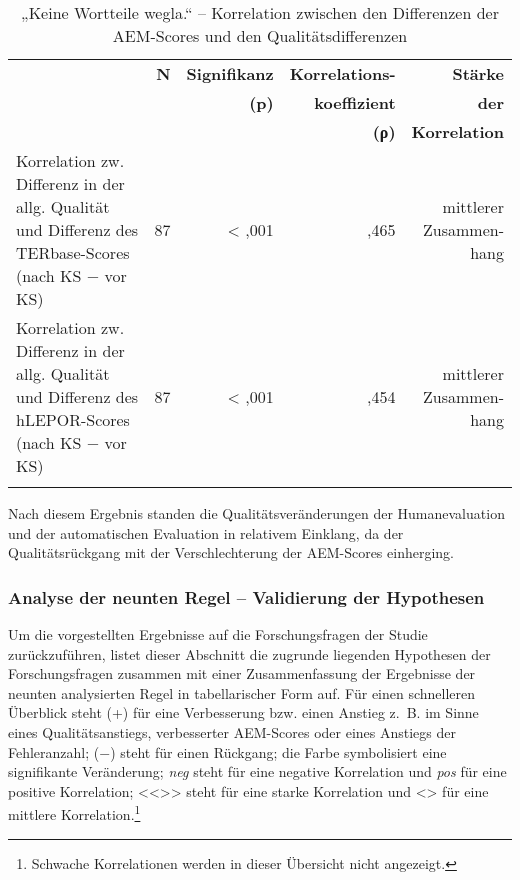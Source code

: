 \begin{table}
\begin{tabularx}{\textwidth}{Xrrrr}

\lsptoprule
& \textbf{N} & { \textbf{Signifikanz} } & \textbf{Korrelations-} & \textbf{Stärke}\\
& & \textbf{(p)} & \textbf{koeffizient} & \textbf{der}\\
& & & \textbf{(ρ)} &  \textbf{Korrelation}\\
\midrule
Korrelation zw. Differenz in der allg. Qualität und Differenz des TERbase{}-Scores (nach KS $-$ vor KS) & { 87} & < ,001 & ,465 & \makecell[tr]{mittlerer\\Zusammen-\\hang}\\
\tablevspace
Korrelation zw. Differenz in der allg. Qualität und Differenz des hLEPOR-Scores (nach KS $-$ vor KS) & { 87} & < ,001 & ,454 & \makecell[tr]{mittlerer\\Zusammen-\\hang}\\
\lspbottomrule
\end{tabularx}
\caption{\label{tab:05:87}„Keine Wortteile wegla.“ -- Korrelation zwischen den Differenzen der AEM-Scores und den Qualitätsdifferenzen   }
\end{table}

Nach diesem Ergebnis standen die Qualitätsveränderungen der Humanevaluation und der automatischen Evaluation in relativem Einklang, da der Qualitätsrückgang mit der Verschlechterung der AEM-Scores einherging.

\subsubsection{\label{sec:5.3.9.7}Analyse der neunten Regel -- Validierung der Hypothesen}
\largerpage
Um die vorgestellten Ergebnisse auf die Forschungsfragen der Studie zurückzuführen, listet dieser Abschnitt die zugrunde liegenden Hypothesen der Forschungsfragen zusammen mit einer Zusammenfassung der Ergebnisse der neunten analysierten Regel in tabellarischer Form auf. Für einen schnelleren Überblick steht (+) für eine Verbesserung bzw. einen Anstieg z.~B. im Sinne eines Qualitätsanstiegs, verbesserter AEM-Scores oder eines Anstiegs der Fehleranzahl; ($-$) steht für einen Rückgang; die  Farbe symbolisiert eine signifikante Veränderung; \textit{neg} steht für eine negative Korrelation und \textit{pos} für eine positive Korrelation; <{}<{}>{}> steht für eine starke Korrelation und <> für eine mittlere Korrelation.\footnote{\textrm{Schwache Korrelationen werden in dieser Übersicht nicht angezeigt.}}

